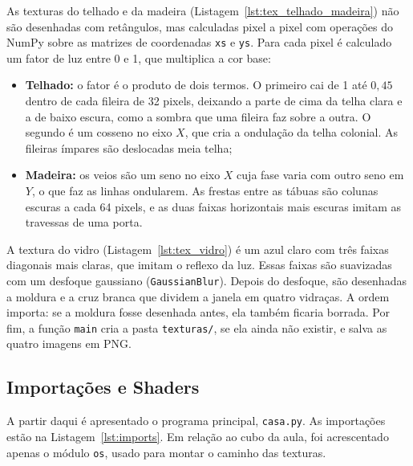 \documentclass{article}
\begin{document}
As texturas do telhado e da madeira (Listagem~\ref{lst:tex_telhado_madeira}) não são desenhadas com retângulos, mas calculadas pixel a pixel com operações do NumPy sobre as matrizes de coordenadas \texttt{xs} e \texttt{ys}. Para cada pixel é calculado um fator de luz entre 0 e 1, que multiplica a cor base:

\begin{itemize}
    \item \textbf{Telhado:} o fator é o produto de dois termos. O primeiro cai de 1 até $0{,}45$ dentro de cada fileira de 32 pixels, deixando a parte de cima da telha clara e a de baixo escura, como a sombra que uma fileira faz sobre a outra. O segundo é um cosseno no eixo $X$, que cria a ondulação da telha colonial. As fileiras ímpares são deslocadas meia telha;
    \item \textbf{Madeira:} os veios são um seno no eixo $X$ cuja fase varia com outro seno em $Y$, o que faz as linhas ondularem. As frestas entre as tábuas são colunas escuras a cada 64 pixels, e as duas faixas horizontais mais escuras imitam as travessas de uma porta.
\end{itemize}



A textura do vidro (Listagem~\ref{lst:tex_vidro}) é um azul claro com três faixas diagonais mais claras, que imitam o reflexo da luz. Essas faixas são suavizadas com um desfoque gaussiano (\texttt{GaussianBlur}). Depois do desfoque, são desenhadas a moldura e a cruz branca que dividem a janela em quatro vidraças. A ordem importa: se a moldura fosse desenhada antes, ela também ficaria borrada. Por fim, a função \texttt{main} cria a pasta \texttt{texturas/}, se ela ainda não existir, e salva as quatro imagens em PNG.



\subsection{Importações e Shaders}

A partir daqui é apresentado o programa principal, \texttt{casa.py}. As importações estão na Listagem~\ref{lst:imports}. Em relação ao cubo da aula, foi acrescentado apenas o módulo \texttt{os}, usado para montar o caminho das texturas.
\end{document}
